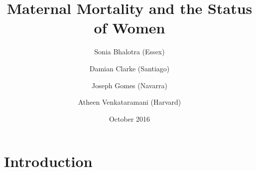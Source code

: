 \documentclass[9pt,letterpaper,subeqn]{beamer}
\title{Maternal Mortality and the Status of Women}
\author[Bhalotra et al.]{Sonia Bhalotra (Essex)
    \and Damian Clarke (Santiago) \\ \vspace{1mm}
    \and Joseph Gomes (Navarra)
    \and Atheen Venkataramani (Harvard)}
\date{October 2016}
\begin{document}
\begin{frame}
\titlepage
\end{frame}

\section{Introduction}
%
\end{document}
